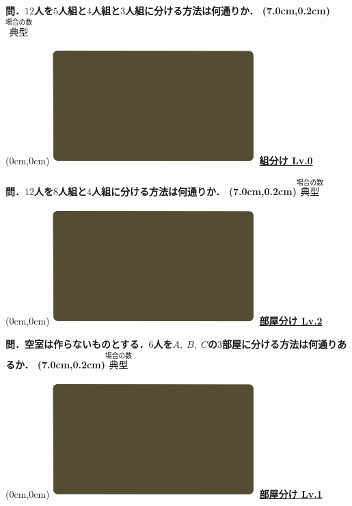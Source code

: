 \documentclass[10pt,
fleqn,
dvipdfmx,
uplatex
]{jsarticle}
\begin{document}
\huge 
\bf\boldmath 問．${12}$人を$5$人組と$4$人組と$3$人組に分ける方法は何通りか．
\at(7.0cm,0.2cm){\small\color{bradorange}$\overset{\text{場合の数}}{\text{典型}}$}


\newpage



\at(0cm,0cm){\includegraphics[width=8cm,bb=0 0 1920 1080]{./youtube/thumbnails/templates/smart_background/場合の数.jpeg}}
{\color{orange}\bf\boldmath\huge\underline{組分け Lv.0 }}\vspace{0.3zw}

\huge 
\bf\boldmath 問．${12}$人を$8$人組と$4$人組に分ける方法は何通りか．
\at(7.0cm,0.2cm){\small\color{bradorange}$\overset{\text{場合の数}}{\text{典型}}$}


\newpage



\at(0cm,0cm){\includegraphics[width=8cm,bb=0 0 1920 1080]{./youtube/thumbnails/templates/smart_background/場合の数.jpeg}}
{\color{orange}\bf\boldmath\huge\underline{部屋分け Lv.2 }}\vspace{0.3zw}

\LARGE 
\bf\boldmath 問．空室は作らないものとする．$6$人を$A,\;B,\;C$の$3$部屋に分ける方法は何通りあるか．
\at(7.0cm,0.2cm){\small\color{bradorange}$\overset{\text{場合の数}}{\text{典型}}$}


\newpage



\at(0cm,0cm){\includegraphics[width=8cm,bb=0 0 1920 1080]{./youtube/thumbnails/templates/smart_background/場合の数.jpeg}}
{\color{orange}\bf\boldmath\huge\underline{部屋分け Lv.1 }}\vspace{0.3zw}
\end{document}
